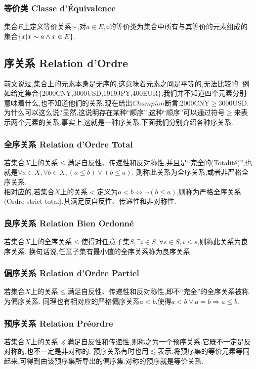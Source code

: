 \documentclass[12pt, a4paper, oneside]{ctexbook}
\begin{document}
  \subsubsection{等价类 Classe d'Équivalence}
  集合$E$上定义等价关系$\thicksim $,对$a\in E$,$a$的等价类为集合中所有与其等价的元素组成的集合$\{x|x\thicksim a\land x\in E\}$.
  
  \subsection{序关系 Relation d'Ordre}
  前文说过,集合上的元素本身是无序的,这意味着元素之间是平等的,无法比较的.
  例如给定集合$\{$2000CNY,3000USD,1919JPY,400EUR$\}$,我们并不知道四个元素分别意味着什么,也不知道他们的关系.现在给出$Champion$断言:2000CNY$\ge$3000USD.
  为什么可以这么说?显然,这说明存在某种“顺序”,这种“顺序”可以通过符号$\ge$来表示两个元素的关系.事实上,这就是一种序关系.下面我们分别介绍各种序关系.
  \subsubsection{全序关系 Relation d'Ordre Total}
  若集合$X$上的关系$\leq$满足自反性、传递性和反对称性,并且是“完全的(Totalité)”,也就是$\forall a\in X,\forall b\in X,(a\leq b)\lor(b\leq a)$.
  则称此关系为全序关系,或者非严格全序关系.\\
  
  相对应的,若集合$X$上的关系$<$定义为$a<b\Leftrightarrow \lnot(b\leq a)$,则称为严格全序关系(Ordre strict total).其满足反自反性、传递性和非对称性.
  \subsubsection{良序关系 Relation Bien Ordonné}
  若集合$X$上的全序关系$\leq$使得对任意子集$S,\exists i\in S,\forall s\in S,i\leq s$,则称此关系为良序关系.
  换句话说,任意子集有最小值的全序关系称为良序关系.

  \subsubsection{偏序关系 Relation d'Ordre Partiel}
  若集合$X$上的关系$\leq$满足自反性、传递性和反对称性,即不“完全”的全序关系被称为偏序关系.
  同理也有相对应的严格偏序关系$a<b$,使得$a<b\lor a=b\Rightarrow a\leq b$.
  \subsubsection{预序关系 Relation Préordre}
  若集合$X$上的关系$\preceq $满足自反性和传递性,则称之为一个预序关系.它既不一定是反对称的,也不一定是非对称的.
  预序关系有时也用$\lesssim $表示.将预序集的等价元素等同起来,可得到由该预序集所导出的偏序集.对称的预序就是等价关系.
\end{document}
